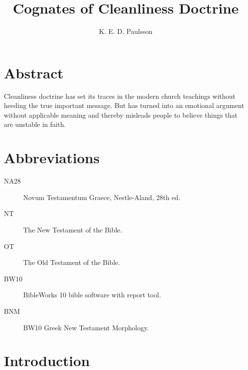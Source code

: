 \documentclass[a4paper,twocolumn,twoside,notitlepage,10pt]{article}
\title{Cognates of Cleanliness Doctrine}
\author{K. E. D. Paulsson}
\begin{document}
\frenchspacing
\newcommand{\entlbl}[1]{\index[eng]{#1}\label{itm:#1}}
\newcommand{\entref}[1]{\emph{#1} ~($\rightarrow$~\pageref{itm:#1})}
\newcommand{\entrefgls}[1]{\emph{#1}$\rightarrow$\pageref{itm:#1}}
\newcommand{\grc}[1]{\greektext{#1}\latintext}
\newcommand{\cdfoot}[2]{\footnote{\emph{CD}, s.v. ``{#1},'' accessed \printdate{#2}.}}
\newcommand{\bkfoot}[3]{\footnote{{#3}, ``{#1},'' \emph{TDNT} {#2}.}}
\newcommand{\bksfoot}[2]{\footnote{{#2}, \emph{TDNT} {#1}.}}


\newcommand{\entgls}[1]{\gls{#1} \glsdesc{#1}}
\newcommand{\entglos}[1]{\\\textbf{\gls{#1}} \glsdesc{#1}}



\maketitle

\section{Abstract}
Cleanliness doctrine has set its traces in the modern church teachings without heeding the true
important message. But has turned into an emotional argument without applicable meaning and
thereby misleads people to believe things that are unstable in faith.

\section{Abbreviations}
\begin{description}
    \item[NA28] Novum Testamentum Graece, Nestle-Aland, 28th ed.
	\item[NT] The New Testament of the Bible.
	\item[OT] The Old Testament of the Bible.
	\item[BW10] BibleWorks 10 bible software with report tool.
	\item[BNM] BW10 Greek New Testament Morphology.
\end{description}

\section{Introduction}
\end{document}

